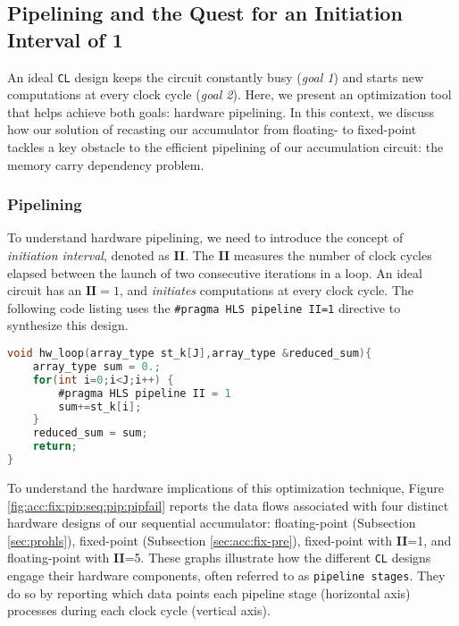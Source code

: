 \documentclass[12pt,american]{article}
\begin{document}
\subsection{Pipelining and the Quest for an Initiation Interval of 1}\label{sec:acc:pipelining}

An ideal \texttt{CL} design keeps the circuit constantly busy (\textit{goal 1}) and starts new computations at every clock cycle (\textit{goal 2}). Here, we present an optimization tool that helps achieve both goals: hardware pipelining. In this context, we discuss how our solution of recasting our accumulator from floating- to fixed-point tackles a key obstacle to the efficient pipelining of our accumulation circuit: the memory carry dependency problem.

\subsubsection{Pipelining}

To understand hardware pipelining, we need to introduce the concept of \textit{initiation interval}, denoted as \textbf{II}. The \textbf{II} measures the number of clock cycles elapsed between the launch of two consecutive iterations in a loop. An ideal circuit has an $\textbf{II}=1$, and \textit{initiates} computations at every clock cycle. The following code listing uses the \texttt{\#pragma HLS pipeline II=1} directive to synthesize this design.

\begin{lstlisting}[language=C,caption= {Pipelined Accumulator},basicstyle=\footnotesize,label=list:acc:pip]
void hw_loop(array_type st_k[J],array_type &reduced_sum){
    array_type sum = 0.;
    for(int i=0;i<J;i++) {
        #pragma HLS pipeline II = 1
        sum+=st_k[i];
    }
    reduced_sum = sum;
    return;
}
\end{lstlisting}

To understand the hardware implications of this optimization technique, Figure \ref{fig:acc:fix:pip:seq:pip:pipfail} reports the data flows associated with four distinct hardware designs of our sequential accumulator: floating-point (Subsection \ref{sec:prohls}), fixed-point (Subsection \ref{sec:acc:fix-pre}), fixed-point with \textbf{II}=1, and floating-point with \textbf{II}=5. These graphs illustrate how the different \texttt{CL} designs engage their hardware components, often referred to as \texttt{pipeline stages}. They do so by reporting which data points each pipeline stage (horizontal axis) processes during each clock cycle (vertical axis). 
\end{document}
